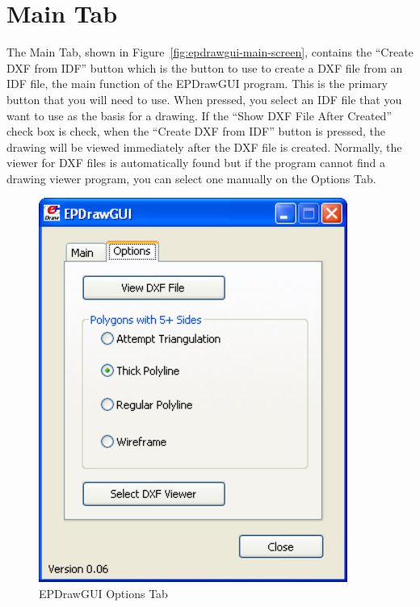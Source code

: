 \section{Main Tab}\label{main-tab}

The Main Tab, shown in Figure~\ref{fig:epdrawgui-main-screen}, contains the ``Create DXF from IDF'' button which is the button to use to create a DXF file from an IDF file, the main function of the EPDrawGUI program. This is the primary button that you will need to use. When pressed, you select an IDF file that you want to use as the basis for a drawing. If the ``Show DXF File After Created'' check box is check, when the ``Create DXF from IDF'' button is pressed, the drawing will be viewed immediately after the DXF file is created. Normally, the viewer for DXF files is automatically found but if the program cannot find a drawing viewer program, you can select one manually on the Options Tab.

\begin{figure}[hbtp] %
\centering
\includegraphics[width=0.9\textwidth, height=0.9\textheight, keepaspectratio=true]{media/image029.png}
\caption{EPDrawGUI Options Tab \protect \label{fig:epdrawgui-options-tab}}
\end{figure}
